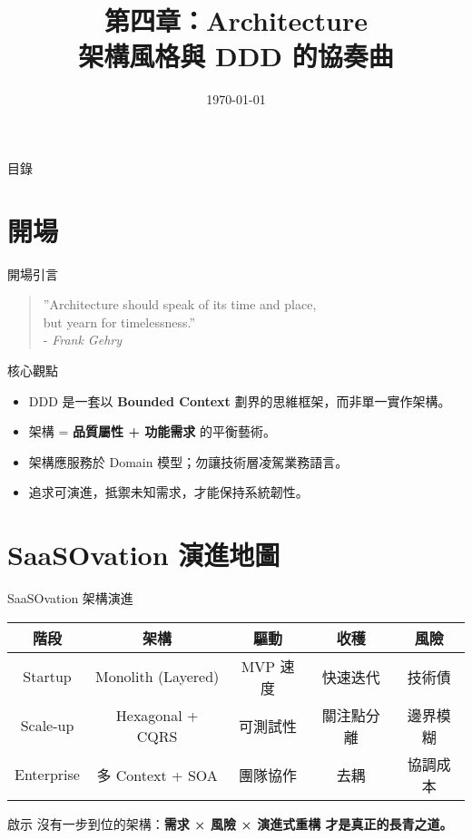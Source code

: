 \documentclass[UTF8]{beamer}
\title[第四章 · Architecture 與 DDD]{第四章：Architecture \\ 架構風格與 DDD 的協奏曲}
\date{\today}
\begin{document}
\begin{frame}
    \titlepage
\end{frame}

\begin{frame}{目錄}
    \scriptsize
    \tableofcontents[hideallsubsections]
\end{frame}


\section{開場}
\begin{frame}{開場引言}
    \begin{quote}
        \Large ''Architecture should speak of its time and place,\\
        but yearn for timelessness.'' \\
        \small - \textit{Frank Gehry}
    \end{quote}
\end{frame}

\begin{frame}{核心觀點}
    \begin{itemize}
        \item DDD 是一套以 \textbf{Bounded Context} 劃界的思維框架，而非單一實作架構。
        \item 架構 = \textbf{品質屬性 + 功能需求} 的平衡藝術。
        \item 架構應服務於 Domain 模型；勿讓技術層凌駕業務語言。
        \item 追求可演進，抵禦未知需求，才能保持系統韌性。
    \end{itemize}
\end{frame}

\section{SaaSOvation 演進地圖}
\begin{frame}{SaaSOvation 架構演進}
    \scriptsize
    \begin{tabular}{|c|c|c|c|c|}
        \hline
        階段       & 架構               & 驅動     & 收穫       & 風險     \\ \hline\hline
        Startup    & Monolith (Layered) & MVP 速度 & 快速迭代   & 技術債   \\ \hline
        Scale-up   & Hexagonal + CQRS   & 可測試性 & 關注點分離 & 邊界模糊 \\ \hline
        Enterprise & 多 Context + SOA   & 團隊協作 & 去耦       & 協調成本 \\ \hline
    \end{tabular}
    \vspace{0.3cm}
    \begin{block}{啟示}
        沒有一步到位的架構：\bfseries{需求 × 風險 × 演進式重構} 才是真正的長青之道。
    \end{block}
\end{frame}
\end{document}
